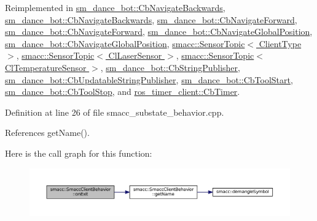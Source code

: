 Reimplemented in \hyperlink{classsm__dance__bot_1_1CbNavigateBackwards_ac85cc397d597120fc8906b98d4241fe8}{sm\+\_\+dance\+\_\+bot\+::\+Cb\+Navigate\+Backwards}, \hyperlink{classsm__dance__bot_1_1CbNavigateBackwards_ac85cc397d597120fc8906b98d4241fe8}{sm\+\_\+dance\+\_\+bot\+::\+Cb\+Navigate\+Backwards}, \hyperlink{classsm__dance__bot_1_1CbNavigateForward_abd291ba77cd42537324eb9fbfc44cd22}{sm\+\_\+dance\+\_\+bot\+::\+Cb\+Navigate\+Forward}, \hyperlink{classsm__dance__bot_1_1CbNavigateForward_abd291ba77cd42537324eb9fbfc44cd22}{sm\+\_\+dance\+\_\+bot\+::\+Cb\+Navigate\+Forward}, \hyperlink{classsm__dance__bot_1_1CbNavigateGlobalPosition_a63737ce810efefc8c29e6b1b332d2e11}{sm\+\_\+dance\+\_\+bot\+::\+Cb\+Navigate\+Global\+Position}, \hyperlink{classsm__dance__bot_1_1CbNavigateGlobalPosition_a63737ce810efefc8c29e6b1b332d2e11}{sm\+\_\+dance\+\_\+bot\+::\+Cb\+Navigate\+Global\+Position}, \hyperlink{classsmacc_1_1SensorTopic_a3d667ad8340bd04a8a6b84eccfebe3f0}{smacc\+::\+Sensor\+Topic$<$ Client\+Type $>$}, \hyperlink{classsmacc_1_1SensorTopic_a3d667ad8340bd04a8a6b84eccfebe3f0}{smacc\+::\+Sensor\+Topic$<$ Cl\+Laser\+Sensor $>$}, \hyperlink{classsmacc_1_1SensorTopic_a3d667ad8340bd04a8a6b84eccfebe3f0}{smacc\+::\+Sensor\+Topic$<$ Cl\+Temperature\+Sensor $>$}, \hyperlink{classsm__dance__bot_1_1CbStringPublisher_a487d8302e60f01401a7d189382ba5f73}{sm\+\_\+dance\+\_\+bot\+::\+Cb\+String\+Publisher}, \hyperlink{classsm__dance__bot_1_1CbUpdatableStringPublisher_a16af5659caeae65c4782a4fcf82ac05e}{sm\+\_\+dance\+\_\+bot\+::\+Cb\+Updatable\+String\+Publisher}, \hyperlink{classsm__dance__bot_1_1CbToolStart_a5cb9f2b22b8039e3745f997cd2301775}{sm\+\_\+dance\+\_\+bot\+::\+Cb\+Tool\+Start}, \hyperlink{classsm__dance__bot_1_1CbToolStop_a84f13b3392558cdabd7a141445b0fa02}{sm\+\_\+dance\+\_\+bot\+::\+Cb\+Tool\+Stop}, and \hyperlink{classros__timer__client_1_1CbTimer_a27d62ebacf667d4c2518c0416ee7b25b}{ros\+\_\+timer\+\_\+client\+::\+Cb\+Timer}.



Definition at line 26 of file smacc\+\_\+substate\+\_\+behavior.\+cpp.



References get\+Name().




Here is the call graph for this function\+:
\nopagebreak
\begin{figure}[H]
\begin{center}
\leavevmode
\includegraphics[width=350pt]{classsmacc_1_1SmaccClientBehavior_ac0cd72d42bd00425362a97c9803ecce5_cgraph}
\end{center}
\end{figure}


